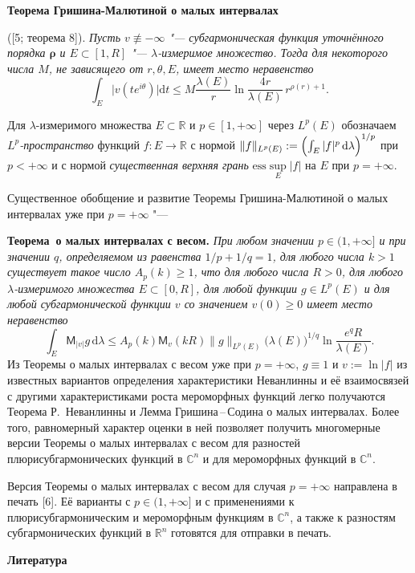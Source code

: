  \noindent
{\bf Теорема Гришина\--Малютиной о малых интервалах} {\rm ([5; теорема 8]). {\it Пусть $v\not\equiv -\infty$ "--- субгармоническая функция уточнённого порядка $\mathbf{\rho}$ и $E\subset [1,R]$ "--- $\lambda$-измеримое множество. Тогда для некоторого числа $M$, не зависящего от $r, \theta, E$, имеет место неравенство
$$
\int_{E} \bigl|v(te^{i\theta})\bigr| \mathrm{d} t\leq
M\frac{\lambda( E)}{r}\ln
\frac{4r}{\lambda( E)}\, r^{\rho(r)+1}.
$$
}

Для $\lambda$-измеримого множества $E\subset \mathbb R$ и $p\in [1,+\infty]$
через $L^p(E)$ обозначаем \textit{$L^p$-пространство\/} функций $f\colon E\to \mathbb R$ с нормой $\|f\|_{L^p(E)}:=\Bigl(\int_E|f|^p\,\mathrm{d}\lambda\Bigr)^{1/p}$ при $p<+\infty$ и с нормой \textit{существенная верхняя грань\/} $\mathrm{ess}\sup\limits_E |f|$ на $E$ при $p=+\infty$.

Существенное обобщение и развитие Теоремы Гришина\--Малютиной о малых интервалах уже при $p=+\infty$ "---

\noindent
\textbf{Теорема~о малых интервалах с весом.} {\it При любом значении $p\in (1,+\infty]$ и при значении $q$, определяемом из равенства $1/p+1/q=1$, для любого числа $k>1$ существует такое число $A_p(k)\geq 1$, что
для любого числа $R> 0$, для любого $\lambda$-измеримого множества $E\subset [0,R]$, для любой функции $g\in L^p(E)$ и для любой субгармонической функции $v$ со значением $v(0)\geq 0$ имеет место неравенство
$$
\int_E\mathsf{M}_{|v|}g\,\mathrm{d} \lambda \leq A_p(k)\mathsf{M}_{v}(kR)
\|g\|_{L^p(E)}\bigl(\lambda(E)\bigr)^{1/q}\ln \frac{e^qR}{\lambda(E)}.
$$
}
Из Теоремы о малых интервалах с весом уже при $p=+\infty$, $g\equiv 1$ и $v:=\ln |f|$ из известных вариантов определения характеристики Неванлинны и её взаимосвязей с другими характеристиками роста мероморфных функций легко получаются Теорема Р.~Неванлинны и Лемма Гришина\,--\,Содина о малых интервалах. Более того, равномерный характер оценки в ней позволяет получить многомерные версии Теоремы о малых интервалах с весом для разностей плюрисубгармонических функций в $\mathbb C^n$ и для мероморфных функций в $\mathbb C^n$.

Версия Теоремы о малых интервалах с весом для случая $p=+\infty$ направлена
в печать [6]. Её варианты с $p\in (1,+\infty]$ и с применениями к плюрисубгармоническим и мероморфным функциям в $\mathbb C^n$, а также
к разностям субгармонических функций в $\mathbb R^n$ готовятся для отправки в печать.

\smallskip \centerline {\bf Литература} \nopagebreak

}
